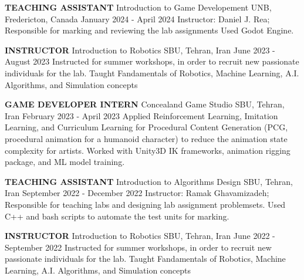 \begin{cventries}
    \cventry
    {\textbf{TEACHING ASSISTANT}}
    {Introduction to Game Developement}
    {UNB, Fredericton, Canada}
    {January 2024 - April 2024}
    {Instructor: Daniel J. Rea; Responsible for marking and reviewing the lab assignments \newline Used Godot Engine.}
    \vspace{0.4 cm}
\end{cventries}

\begin{cventries}
    \cventry
    {\textbf{INSTRUCTOR}}
    {Introduction to Robotics}
    {SBU, Tehran, Iran}
    {June 2023 - August 2023}
    {Instructed for summer workshops, in order to recruit new passionate individuals for the lab.
    \newline Taught Fandamentals of Robotics, Machine Learning, A.I. Algorithms, and Simulation concepts}
    \vspace{0.4 cm}
\end{cventries}

\begin{cventries}
    \cventry
    {\textbf{GAME DEVELOPER INTERN}}
    {Concealand Game Studio}
    {SBU, Tehran, Iran}
    {February 2023 - April 2023}
    {Applied Reinforcement Learning, Imitation Learning, and Curriculum Learning for Procedural Content Generation (PCG, procedural animation for a humanoid character) to reduce the animation state complexity for artists. \newline Worked with Unity3D IK frameworks, animation rigging package, and ML model training.}
\end{cventries}
\begin{cventries}
    \cventry
    {\textbf{TEACHING ASSISTANT}}
    {Introduction to Algorithms Design}
    {SBU, Tehran, Iran}
    {September 2022 - December 2022}
    {Instructor: Ramak Ghavamizadeh; Responsible for teaching labs and designing lab assignment problemsets.
    \newline Used C++ and bash scripts to automate the test units for marking.}
    \vspace{0.4 cm}
\end{cventries}

\begin{cventries}
    \cventry
    {\textbf{INSTRUCTOR}}
    {Introduction to Robotics}
    {SBU, Tehran, Iran}
    {June 2022 - September 2022}
    {Instructed for summer workshops, in order to recruit new passionate individuals for the lab.
    \newline Taught Fandamentals of Robotics, Machine Learning, A.I. Algorithms, and Simulation concepts}
    \vspace{0.4 cm}
\end{cventries}

